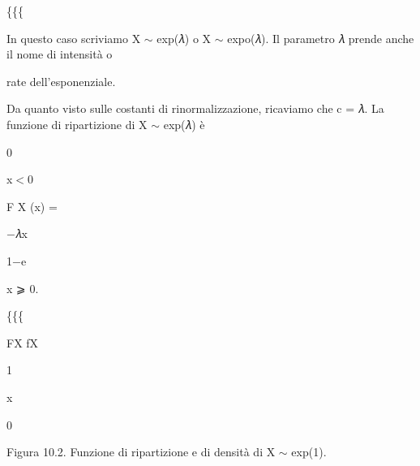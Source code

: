 \documentclass[a4paper,portrait,12pt]{article}
\begin{document}
\{\{\{





\begin{flushleft}
In questo caso scriviamo X $\sim$ exp(𝜆) o X $\sim$ expo(𝜆). Il parametro 𝜆 prende anche il nome di intensit\`{a} o
\end{flushleft}


\begin{flushleft}
rate dell'esponenziale.
\end{flushleft}


\begin{flushleft}
Da quanto visto sulle costanti di rinormalizzazione, ricaviamo che c = 𝜆. La funzione di ripartizione di X $\sim$ exp(𝜆) \`{e}
\end{flushleft}


0


\begin{flushleft}
x$<$0
\end{flushleft}


\begin{flushleft}
F X (x) =
\end{flushleft}


\begin{flushleft}
$-$𝜆x
\end{flushleft}


\begin{flushleft}
1$-$e
\end{flushleft}


\begin{flushleft}
x ⩾ 0.
\end{flushleft}





\{\{\{





\begin{flushleft}
FX fX
\end{flushleft}


1





\begin{flushleft}
x
\end{flushleft}





0


\begin{flushleft}
Figura 10.2. Funzione di ripartizione e di densit\`{a} di X $\sim$ exp(1).
\end{flushleft}
\end{document}
